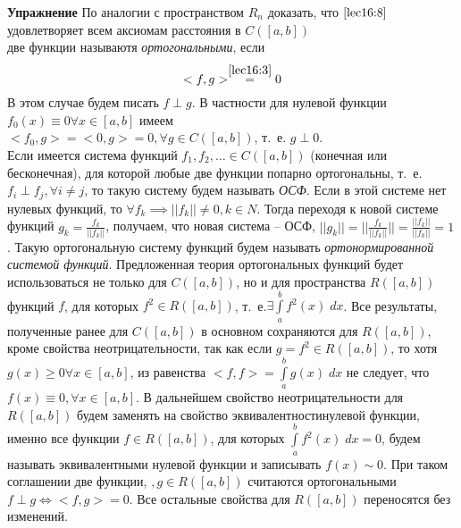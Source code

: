 \documentclass[../../main.tex]{subfiles}
\begin{document}
	\textbf{Упражнение} По аналогии с пространством $R_n$ доказать, что
	 $\eqref{lec16:8}$ удовлетворяет всем аксиомам расстояния в $C(\left[a, 
	 b\right])$\\
	две функции называютя \emph{ортогональными}, если
	\begin{equation} 
	\label{lec16:9}
	<f, g> \stackrel{\eqref{lec16:3}}{=} 0
	\end{equation}
	 В этом случае будем писать $f \perp g$. В частности для нулевой функции 
	 $f_0(x)
	  \equiv 0 \forall x \in \left[a, b\right]$ имеем\\
	 $<f_0, g> = <0, g> = 0, \forall g \in C(\left[a, b\right])$, т.~е. $g\perp 
	 0$.\\
	 Если имеется система функций $f_1, f_2, \ldots \in  C(\left[a, b\right]) $
	  (конечная или бесконечная), для которой любые две функции попарно 
	  ортогональны,
	   т.~е. $f_i \perp f_j, \forall i \neq j$, то такую систему будем называть 
	   \emph{ОСФ}.
	    Если в этой системе нет нулевых функций, то $\forall f_k \implies ||f_k||
	     \neq 0, k \in N $. Тогда переходя к новой системе функций $g_k =
	      \frac{f_k}{||f_k||}$, получаем, что новая система \--- ОСФ, $||g_k|| =
	       ||\frac{f_k}{||f_k||}|| = \frac{||f_k||}{||f_k||} = 1$. Такую 
	       ортогональную
	        систему функций будем называть \emph{ортонормированной системой 
	        функций}.
	 Предложенная теория ортогональных функций будет использоваться не только для
	  $C(\left[a, b\right])$, но и для пространства $R(\left[a, b\right])$ 
	  функций $f$,
	  	   для которых $f^2 \in R(\left[a, b\right])$, т.~е.$\exists 
	  	   \int\limits_a^b
   		f^2(x)\; dx$. Все результаты, полученные ранее для $C(\left[a, b\right])$ 
   		в
	    основном сохраняются для $R(\left[a, b\right])$, кроме свойства
	     неотрицательности, так как  если $g = f^2 \in R(\left[a, b\right])$, то 
	     хотя
	     $g(x) \ge 0 \forall x \in \left[a, b\right]$, из равенства $<f,f> =
	     \int\limits_a^b g(x)\; dx$ не следует, что $f(x) \equiv 0, \forall x \in
      \left[a, b\right]$. В дальнейшем свойство неотрицательности для 
      $R(\left[a,
      b\right])$ будем заменять на свойство эквивалентностинулевой функции,   
      именно
       все функции $f \in R(\left[a, b\right])$, для которых
      $\int\limits_a^b f^2(x)\; dx = 0$, будем называть эквивалентными нулевой
      функции и записывать $f(x) \sim 0$. При таком соглашении две функции, $,
	            g \in R(\left[a, b\right])$ считаются ортогональными $f \perp g
	             \iff <f, g> = 0$. Все остальные свойства для $R(\left[a,
	              b\right])$ переносятся без изменений.
\end{document}
